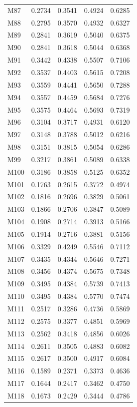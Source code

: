 \begin{longtable}{lrrrr}
M87 & 0.2734 & 0.3541 & 0.4924 & 0.6285 \\
M88 & 0.2795 & 0.3570 & 0.4932 & 0.6327 \\
M89 & 0.2841 & 0.3619 & 0.5040 & 0.6375 \\
M90 & 0.2841 & 0.3618 & 0.5044 & 0.6368 \\
M91 & 0.3442 & 0.4338 & 0.5507 & 0.7106 \\
M92 & 0.3537 & 0.4403 & 0.5615 & 0.7208 \\
M93 & 0.3559 & 0.4441 & 0.5650 & 0.7288 \\
M94 & 0.3557 & 0.4459 & 0.5684 & 0.7276 \\
M95 & 0.3575 & 0.4464 & 0.5693 & 0.7319 \\
M96 & 0.3104 & 0.3717 & 0.4931 & 0.6120 \\
M97 & 0.3148 & 0.3788 & 0.5012 & 0.6216 \\
M98 & 0.3151 & 0.3815 & 0.5054 & 0.6286 \\
M99 & 0.3217 & 0.3861 & 0.5089 & 0.6338 \\
M100 & 0.3186 & 0.3858 & 0.5125 & 0.6352 \\
M101 & 0.1763 & 0.2615 & 0.3772 & 0.4974 \\
M102 & 0.1816 & 0.2696 & 0.3829 & 0.5061 \\
M103 & 0.1866 & 0.2706 & 0.3847 & 0.5089 \\
M104 & 0.1908 & 0.2714 & 0.3913 & 0.5166 \\
M105 & 0.1914 & 0.2716 & 0.3881 & 0.5156 \\
M106 & 0.3329 & 0.4249 & 0.5546 & 0.7112 \\
M107 & 0.3435 & 0.4344 & 0.5646 & 0.7271 \\
M108 & 0.3456 & 0.4374 & 0.5675 & 0.7348 \\
M109 & 0.3495 & 0.4384 & 0.5739 & 0.7413 \\
M110 & 0.3495 & 0.4384 & 0.5770 & 0.7474 \\
M111 & 0.2517 & 0.3286 & 0.4736 & 0.5869 \\
M112 & 0.2575 & 0.3377 & 0.4851 & 0.5969 \\
M113 & 0.2562 & 0.3418 & 0.4856 & 0.6026 \\
M114 & 0.2611 & 0.3505 & 0.4883 & 0.6082 \\
M115 & 0.2617 & 0.3500 & 0.4917 & 0.6084 \\
M116 & 0.1589 & 0.2371 & 0.3373 & 0.4636 \\
M117 & 0.1644 & 0.2417 & 0.3462 & 0.4750 \\
M118 & 0.1673 & 0.2429 & 0.3444 & 0.4786 \\

\end{longtable}
